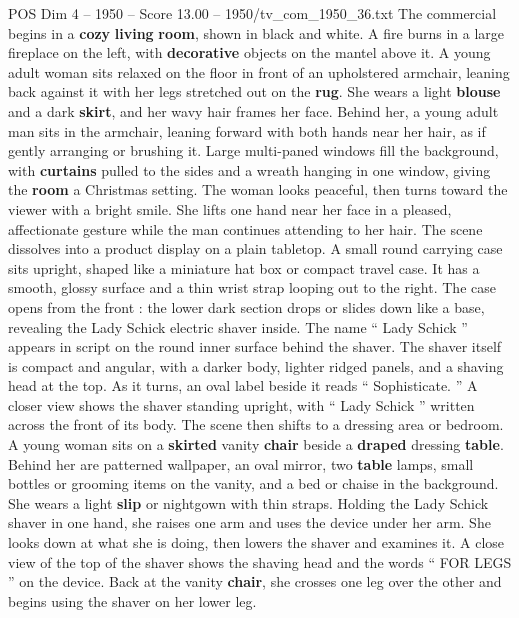 \begin{textsample}{POS Dim 4 – 1950 – Score 13.00 – 1950/tv\_com\_1950\_36.txt}  \label{ex:f4_pos_040}
The commercial begins in a \textbf{cozy} \textbf{living} \textbf{room}, shown in black and white.
A fire burns in a large fireplace on the left, with \textbf{decorative} objects on the mantel above it.
A young adult woman sits relaxed on the floor in front of an upholstered armchair, leaning back against it with her legs stretched out on the \textbf{rug}.
She wears a light \textbf{blouse} and a dark \textbf{skirt}, and her wavy hair frames her face.
Behind her, a young adult man sits in the armchair, leaning forward with both hands near her hair, as if gently arranging or brushing it.
Large multi-paned windows fill the background, with \textbf{curtains} pulled to the sides and a wreath hanging in one window, giving the \textbf{room} a Christmas setting.
The woman looks peaceful, then turns toward the viewer with a bright smile.
She lifts one hand near her face in a pleased, affectionate gesture while the man continues attending to her hair.
The scene dissolves into a product display on a plain tabletop.
A small round carrying case sits upright, shaped like a miniature hat box or compact travel case.
It has a smooth, glossy surface and a thin wrist strap looping out to the right.
The case opens from the front : the lower dark section drops or slides down like a base, revealing the Lady Schick electric shaver inside.
The name “ Lady Schick ” appears in script on the round inner surface behind the shaver.
The shaver itself is compact and angular, with a darker body, lighter ridged panels, and a shaving head at the top.
As it turns, an oval label beside it reads “ Sophisticate. ” A closer view shows the shaver standing upright, with “ Lady Schick ” written across the front of its body.
The scene then shifts to a dressing area or bedroom.
A young woman sits on a \textbf{skirted} vanity \textbf{chair} beside a \textbf{draped} dressing \textbf{table}.
Behind her are patterned wallpaper, an oval mirror, two \textbf{table} lamps, small bottles or grooming items on the vanity, and a bed or chaise in the background.
She wears a light \textbf{slip} or nightgown with thin straps.
Holding the Lady Schick shaver in one hand, she raises one arm and uses the device under her arm.
She looks down at what she is doing, then lowers the shaver and examines it.
A close view of the top of the shaver shows the shaving head and the words “ FOR LEGS ” on the device.
Back at the vanity \textbf{chair}, she crosses one leg over the other and begins using the shaver on her lower leg.

\end{textsample}
